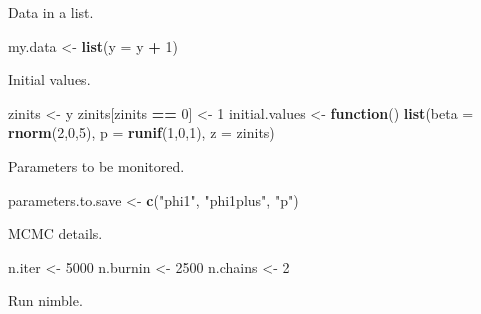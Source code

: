 \documentclass[
  12pt,
]{krantz}
\newenvironment{Shaded}{\begin{snugshade}}{\end{snugshade}}
\newcommand{\AttributeTok}[1]{\textcolor[rgb]{0.13,0.29,0.53}{#1}}
\newcommand{\ControlFlowTok}[1]{\textcolor[rgb]{0.13,0.29,0.53}{\textbf{#1}}}
\newcommand{\DecValTok}[1]{\textcolor[rgb]{0.00,0.00,0.81}{#1}}
\newcommand{\FunctionTok}[1]{\textcolor[rgb]{0.13,0.29,0.53}{\textbf{#1}}}
\newcommand{\NormalTok}[1]{#1}
\newcommand{\OtherTok}[1]{\textcolor[rgb]{0.56,0.35,0.01}{#1}}
\newcommand{\SpecialCharTok}[1]{\textcolor[rgb]{0.81,0.36,0.00}{\textbf{#1}}}
\newcommand{\StringTok}[1]{\textcolor[rgb]{0.31,0.60,0.02}{#1}}
\begin{document}
Data in a list.

\begin{Shaded}
\begin{Highlighting}[]
\NormalTok{my.data }\OtherTok{\textless{}{-}} \FunctionTok{list}\NormalTok{(}\AttributeTok{y =}\NormalTok{ y }\SpecialCharTok{+} \DecValTok{1}\NormalTok{)}
\end{Highlighting}
\end{Shaded}

Initial values.

\begin{Shaded}
\begin{Highlighting}[]
\NormalTok{zinits }\OtherTok{\textless{}{-}}\NormalTok{ y}
\NormalTok{zinits[zinits }\SpecialCharTok{==} \DecValTok{0}\NormalTok{] }\OtherTok{\textless{}{-}} \DecValTok{1}
\NormalTok{initial.values }\OtherTok{\textless{}{-}} \ControlFlowTok{function}\NormalTok{() }\FunctionTok{list}\NormalTok{(}\AttributeTok{beta =} \FunctionTok{rnorm}\NormalTok{(}\DecValTok{2}\NormalTok{,}\DecValTok{0}\NormalTok{,}\DecValTok{5}\NormalTok{),}
                                  \AttributeTok{p =} \FunctionTok{runif}\NormalTok{(}\DecValTok{1}\NormalTok{,}\DecValTok{0}\NormalTok{,}\DecValTok{1}\NormalTok{),}
                                  \AttributeTok{z =}\NormalTok{ zinits)}
\end{Highlighting}
\end{Shaded}

Parameters to be monitored.

\begin{Shaded}
\begin{Highlighting}[]
\NormalTok{parameters.to.save }\OtherTok{\textless{}{-}} \FunctionTok{c}\NormalTok{(}\StringTok{"phi1"}\NormalTok{, }\StringTok{"phi1plus"}\NormalTok{, }\StringTok{"p"}\NormalTok{)}
\end{Highlighting}
\end{Shaded}

MCMC details.

\begin{Shaded}
\begin{Highlighting}[]
\NormalTok{n.iter }\OtherTok{\textless{}{-}} \DecValTok{5000}
\NormalTok{n.burnin }\OtherTok{\textless{}{-}} \DecValTok{2500}
\NormalTok{n.chains }\OtherTok{\textless{}{-}} \DecValTok{2}
\end{Highlighting}
\end{Shaded}

Run nimble.
\end{document}
